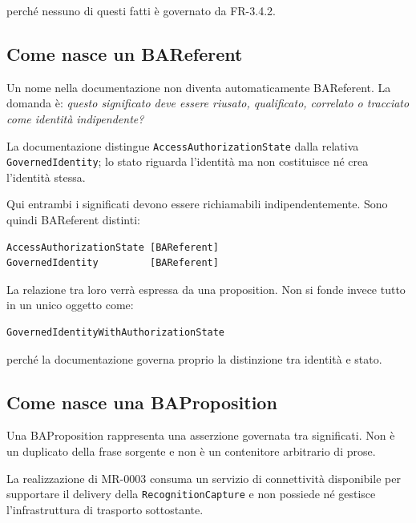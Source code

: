 \documentclass[11pt,a4paper]{article}
\newcommand{\code}[1]{\nolinkurl{#1}}
\begin{document}
perché nessuno di questi fatti è governato da FR-3.4.2.

\subsection{Come nasce un BAReferent}

Un nome nella documentazione non diventa automaticamente BAReferent. La domanda è: \emph{questo significato deve essere riusato, qualificato, correlato o tracciato come identità indipendente?}

\begin{examplebox}
La documentazione distingue \code{AccessAuthorizationState} dalla relativa \code{GovernedIdentity}; lo stato riguarda l'identità ma non costituisce né crea l'identità stessa.
\end{examplebox}

Qui entrambi i significati devono essere richiamabili indipendentemente. Sono quindi BAReferent distinti:

\begin{lstlisting}
AccessAuthorizationState [BAReferent]
GovernedIdentity         [BAReferent]
\end{lstlisting}

La relazione tra loro verrà espressa da una proposition. Non si fonde invece tutto in un unico oggetto come:

\begin{lstlisting}
GovernedIdentityWithAuthorizationState
\end{lstlisting}

perché la documentazione governa proprio la distinzione tra identità e stato.

\subsection{Come nasce una BAProposition}

Una BAProposition rappresenta una asserzione governata tra significati. Non è un duplicato della frase sorgente e non è un contenitore arbitrario di prose.

\begin{examplebox}
La realizzazione di MR-0003 consuma un servizio di connettività disponibile per supportare il delivery della \code{RecognitionCapture} e non possiede né gestisce l'infrastruttura di trasporto sottostante.
\end{examplebox}
\end{document}
